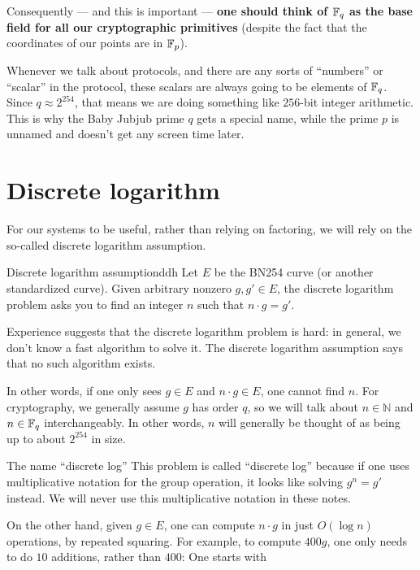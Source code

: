 Consequently --- and this is important --- \textbf{one should think of
$\mathbb{F}_{q}$ as the base field for all our cryptographic primitives}
(despite the fact that the coordinates of our points are in $\mathbb{F}_{p}$).

\begin{remark}{}{}
Whenever we talk about protocols, and there are any sorts of
``numbers'' or ``scalar'' in the protocol,
these scalars are always going to be elements of $\mathbb{F}_q$.
Since $q \approx 2^{254}$,
that means we are doing something like $256$-bit integer arithmetic.
This is why the Baby Jubjub prime $q$ gets a special name,
while the prime $p$ is unnamed and doesn't get any screen time later.
\end{remark}

\section{Discrete logarithm}\label{discretelog}

For our systems to be useful, rather than relying on factoring, we will
rely on the so-called \alert{discrete logarithm assumption}.

\begin{assumption}{Discrete logarithm assumption}{ddh}
Let $E$ be the BN254 curve (or another
standardized curve). Given arbitrary nonzero $g,g' \in E$, the
\alert{discrete logarithm problem} asks you to find an integer $n$ such
that $n \cdot g = g'$.

Experience suggests that the discrete logarithm problem is hard:
in general, we don't know a fast algorithm to solve it.
The \alert{discrete logarithm assumption} says that no such algorithm exists.
\end{assumption}

In other words, if one only sees $g \in E$ and $n \cdot g \in E$,
one cannot find $n$. For cryptography, we generally assume $g$ has
order $q$, so we will talk about $n \in {\mathbb{N}}$ and
$n \in \mathbb{F}_{q}$ interchangeably. In other words, $n$ will
generally be thought of as being up to about $2^{254}$ in size.

\begin{remark}{The name ``discrete log''}{}
This problem is called ``discrete log'' because if one uses multiplicative notation
for the group operation, it looks like solving $g^n = g'$ instead.
We will never use this multiplicative notation in these notes.
\end{remark}

On the other hand, given $g \in E$, one can compute $n \cdot g$ in
just $O( \log n )$ operations, by repeated
squaring.
For example, to compute $400g$, one only needs to do $10$ additions,
rather than $400$: One starts with

